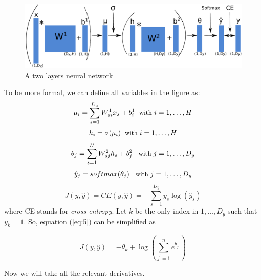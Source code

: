 \documentclass{article}
\begin{document}
 \begin{figure}
\begin{center}
\includegraphics[scale=0.85]{neural.pdf}
\end{center}
\caption{A two layers neural network}
\label{neural}
\end{figure}
To be more formal, we can define all variables in the figure as:
 \begin{equation}\label{eq:1}
\mu_i = \sum_{s=1}^{D_{x}}W^{1}_{si} x_{s} + b^{1}_{i}  \; {\small \text{ with }i = 1, \dots, H}
\end{equation}
\begin{equation}\label{eq:2}
h_i = \sigma(\mu_i)  \; {\small \text{ with }i = 1, \dots, H}
\end{equation}
\begin{equation}\label{eq:3}
\theta_j = \sum_{s=1}^{H}W^{2}_{sj} h_{s} + b^{2}_{j} \;\; {\small \text{ with }j = 1, \dots, D_{y}}
\end{equation}
\begin{equation}\label{eq:4}
\hat{y}_j = softmax(\theta_j) \;\; {\small \text{ with }j = 1, \dots, D_{y}}
\end{equation}
\begin{equation}\label{eq:5}
J(y,\hat{y}) = CE(y,\hat{y}) = -\sum_{s=1}^{D_{y}} y_s  \log(\hat{y}_s)
\end{equation}
where CE stands for \textit{cross-entropy}. Let $k$ be the only index in ${1,\dots,D_{y}}$ such that $y_k =1$. So, equation (\ref{eq:5}) can be simplified as 

\begin{equation}\label{eq:6}
J(y,\hat{y}) = - \theta_k + \log(\sum_{j^{\prime}=1}^{n} e^{\theta_{j^{\prime}}})
\end{equation}

Now we will take all the relevant derivatives.\\
\end{document}
